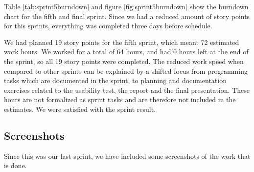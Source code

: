 Table \ref{tab:sprint5burndown} and figure \ref{fig:sprint5burndown} show the burndown chart for the fifth and final sprint. Since we had
a reduced amount of story points for this sprints, everything was completed three days before schedule.

We had planned 19 story points for the fifth sprint, which meant 72 estimated work hours. We worked for a total of 64 hours, and had 0 hours
left at the end of the sprint, so all 19 story points were completed. The reduced work speed when compared to other sprints can be explained
by a shifted focus from programming tasks which are documented in the sprint, to planning and documentation exercises related to the usability
test, the report and the final presentation. These hours are not formalized as sprint tasks and are therefore not included in the estimates.
We were satisfied with the sprint result.

\subsection{Screenshots}
Since this was our last sprint, we have included some screenshots of the work that is done.

